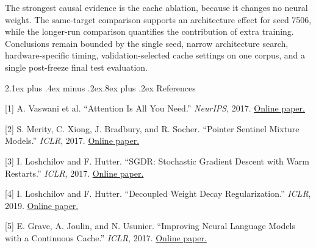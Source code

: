 \documentclass[11pt]{article}
\makeatletter
\renewcommand\section{\@startsection{section}{1}{0pt}%
  {2.1ex plus .4ex minus .2ex}{.8ex plus .2ex}%
  {\normalfont\large\bfseries}}
\makeatother
\begin{document}
The strongest causal evidence is the cache ablation, because it changes
no neural weight. The same-target comparison supports an architecture
effect for seed 7506, while the longer-run comparison quantifies the
contribution of extra training. Conclusions remain bounded by the single
seed, narrow architecture search, hardware-specific timing,
validation-selected cache settings on one corpus, and a single
post-freeze final test evaluation.

\section{References}\label{references}

{[}1{]} A. Vaswani et al. ``Attention Is All You Need.'' \emph{NeurIPS},
2017.
\href{https://papers.neurips.cc/paper/2017/hash/3f5ee243547dee91fbd053c1c4a845aa-Abstract.html}{Online paper.}

{[}2{]} S. Merity, C. Xiong, J. Bradbury, and R. Socher. ``Pointer
Sentinel Mixture Models.'' \emph{ICLR}, 2017.
\href{https://openreview.net/forum?id=Byj72udxe}{Online paper.}

{[}3{]} I. Loshchilov and F. Hutter. ``SGDR: Stochastic Gradient Descent
with Warm Restarts.'' \emph{ICLR}, 2017.
\href{https://openreview.net/forum?id=Skq89Scxx}{Online paper.}

{[}4{]} I. Loshchilov and F. Hutter. ``Decoupled Weight Decay
Regularization.'' \emph{ICLR}, 2019.
\href{https://openreview.net/forum?id=Bkg6RiCqY7}{Online paper.}

{[}5{]} E. Grave, A. Joulin, and N. Usunier. ``Improving Neural Language
Models with a Continuous Cache.'' \emph{ICLR}, 2017.
\href{https://openreview.net/forum?id=B184E5qee}{Online paper.}
\end{document}

